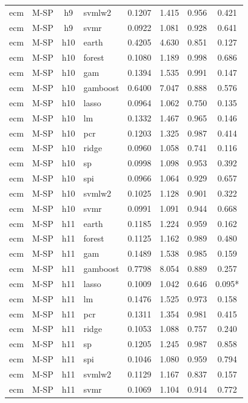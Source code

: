 \begin{ThreePartTable}
\begin{longtable}[t]{llclcccc}
ecm & M-SP & h9 & svmlw2 & 0.1207 & 1.415 & 0.956 & 0.421\\
ecm & M-SP & h9 & svmr & 0.0922 & 1.081 & 0.928 & 0.641\\
\addlinespace
ecm & M-SP & h10 & earth & 0.4205 & 4.630 & 0.851 & 0.127\\
ecm & M-SP & h10 & forest & 0.1080 & 1.189 & 0.998 & 0.686\\
ecm & M-SP & h10 & gam & 0.1394 & 1.535 & 0.991 & 0.147\\
ecm & M-SP & h10 & gamboost & 0.6400 & 7.047 & 0.888 & 0.576\\
ecm & M-SP & h10 & lasso & 0.0964 & 1.062 & 0.750 & 0.135\\
ecm & M-SP & h10 & lm & 0.1332 & 1.467 & 0.965 & 0.146\\
ecm & M-SP & h10 & pcr & 0.1203 & 1.325 & 0.987 & 0.414\\
ecm & M-SP & h10 & ridge & 0.0960 & 1.058 & 0.741 & 0.116\\
ecm & M-SP & h10 & sp & 0.0998 & 1.098 & 0.953 & 0.392\\
ecm & M-SP & h10 & spi & 0.0966 & 1.064 & 0.929 & 0.657\\
ecm & M-SP & h10 & svmlw2 & 0.1025 & 1.128 & 0.901 & 0.322\\
ecm & M-SP & h10 & svmr & 0.0991 & 1.091 & 0.944 & 0.668\\
\addlinespace
ecm & M-SP & h11 & earth & 0.1185 & 1.224 & 0.959 & 0.162\\
ecm & M-SP & h11 & forest & 0.1125 & 1.162 & 0.989 & 0.480\\
ecm & M-SP & h11 & gam & 0.1489 & 1.538 & 0.985 & 0.159\\
ecm & M-SP & h11 & gamboost & 0.7798 & 8.054 & 0.889 & 0.257\\
ecm & M-SP & h11 & lasso & 0.1009 & 1.042 & 0.646 & 0.095*\\
ecm & M-SP & h11 & lm & 0.1476 & 1.525 & 0.973 & 0.158\\
ecm & M-SP & h11 & pcr & 0.1311 & 1.354 & 0.981 & 0.415\\
ecm & M-SP & h11 & ridge & 0.1053 & 1.088 & 0.757 & 0.240\\
ecm & M-SP & h11 & sp & 0.1205 & 1.245 & 0.987 & 0.858\\
ecm & M-SP & h11 & spi & 0.1046 & 1.080 & 0.959 & 0.794\\
ecm & M-SP & h11 & svmlw2 & 0.1129 & 1.167 & 0.837 & 0.157\\
ecm & M-SP & h11 & svmr & 0.1069 & 1.104 & 0.914 & 0.772\\

\end{longtable}
\end{ThreePartTable}
